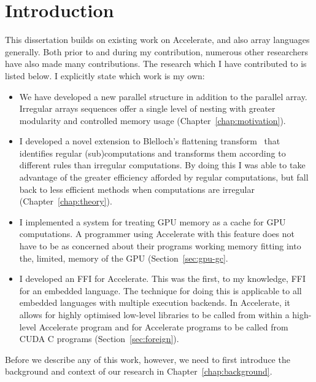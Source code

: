 \chapter{Introduction}


This dissertation builds on existing work on Accelerate, and also array languages generally. Both prior to and during my contribution, numerous other researchers have also made many contributions. The research which I have contributed to is listed below. I explicitly state which work is my own:

\begin{itemize}
\item We have developed a new parallel structure in addition to the parallel array. Irregular arrays sequences offer a single level of nesting with greater modularity and controlled memory usage (Chapter~\ref{chap:motivation}).
\item I developed a novel extension to Blelloch's flattening transform~\cite{Blelloch:compiling1988,Blelloch:nesl1995} that identifies regular (sub)computations and transforms them according to different rules than irregular computations. By doing this I was able to take advantage of the greater efficiency afforded by regular computations, but fall back to less efficient methods when computations are irregular (Chapter~\ref{chap:theory}).
\item I implemented a system for treating GPU memory as a cache for GPU computations. A programmer using Accelerate with this feature does not have to be as concerned about their programs working memory fitting into the, limited, memory of the GPU (Section~\ref{sec:gpu-gc}.
\item I developed an FFI for Accelerate. This was the first, to my knowledge, FFI for an embedded language. The technique for doing this is applicable to all embedded languages with multiple execution backends. In Accelerate, it allows for highly optimised low-level libraries to be called from within a high-level Accelerate program and for Accelerate programs to be called from CUDA C programs (Section~\ref{sec:foreign}).
\end{itemize}

Before we describe any of this work, however, we need to first introduce the background and context of our research in Chapter~\ref{chap:background}.
